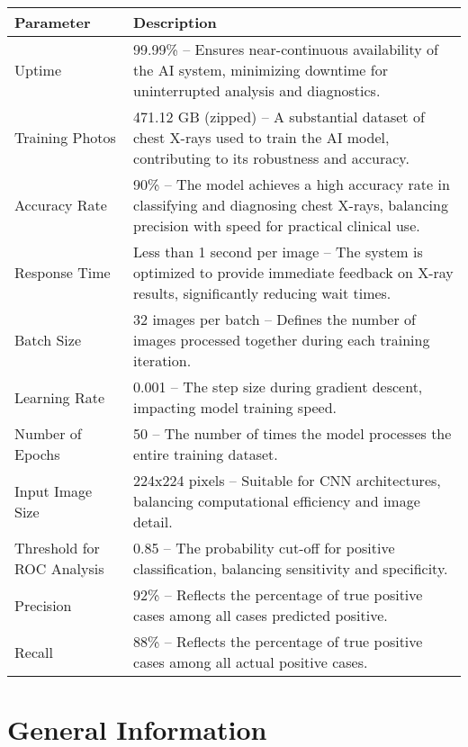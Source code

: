 \documentclass[12pt, titlepage]{article}
\begin{document}
\renewcommand{\arraystretch}{1.3}
\noindent \begin{tabular}{|p{3.5cm}|p{9.5cm}|}
    \hline
    \rowcolor{lightgray} \textbf{Parameter} & \textbf{Description} \\
    \hline
    Uptime & 99.99\% – Ensures near-continuous availability of the AI system, minimizing downtime for uninterrupted analysis and diagnostics. \\
    \hline
    Training Photos & 471.12 GB (zipped) – A substantial dataset of chest X-rays used to train the AI model, contributing to its robustness and accuracy. \\
    \hline
    Accuracy Rate & 90\% – The model achieves a high accuracy rate in classifying and diagnosing chest X-rays, balancing precision with speed for practical clinical use. \\
    \hline
    Response Time & Less than 1 second per image – The system is optimized to provide immediate feedback on X-ray results, significantly reducing wait times. \\
    \hline
    Batch Size & 32 images per batch – Defines the number of images processed together during each training iteration. \\
    \hline
    Learning Rate & 0.001 – The step size during gradient descent, impacting model training speed. \\
    \hline
    Number of Epochs & 50 – The number of times the model processes the entire training dataset. \\
    \hline
    Input Image Size & 224x224 pixels – Suitable for CNN architectures, balancing computational efficiency and image detail. \\
    \hline
    Threshold for ROC Analysis & 0.85 – The probability cut-off for positive classification, balancing sensitivity and specificity. \\
    \hline
    Precision & 92\% – Reflects the percentage of true positive cases among all cases predicted positive. \\
    \hline
    Recall & 88\% – Reflects the percentage of true positive cases among all actual positive cases. \\
    \hline
\end{tabular}

\newpage


\section{General Information}
\end{document}
